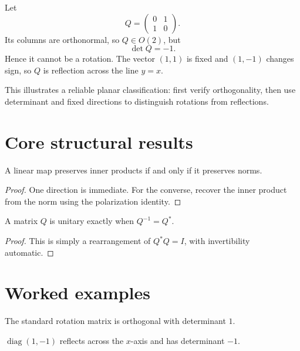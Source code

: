\begin{example}\label{ex:i15-expand-03}
Let
\[
Q=\begin{pmatrix}0&1\\1&0\end{pmatrix}.
\]
Its columns are orthonormal, so \(Q\in O(2)\), but
\[
\det Q=-1.
\]
Hence it cannot be a rotation. The vector \((1,1)\) is fixed and
\((1,-1)\) changes sign, so \(Q\) is reflection across the line \(y=x\).

This illustrates a reliable planar classification: first verify orthogonality,
then use determinant and fixed directions to distinguish rotations from
reflections.
\end{example}
\section{Core structural results}

\begin{theorem}\label{thm:i15-01}
A linear map preserves inner products if and only if it preserves norms.
\begin{proof}
One direction is immediate. For the converse, recover the inner product from the norm using the polarization identity.
\end{proof}
\end{theorem}

\begin{theorem}\label{thm:i15-02}
A matrix $Q$ is unitary exactly when $Q^{-1}=Q^*$.
\begin{proof}
This is simply a rearrangement of $Q^*Q=I$, with invertibility automatic.
\end{proof}
\end{theorem}

\section{Worked examples}

\begin{example}\label{ex:i15-worked-01}
The standard rotation matrix is orthogonal with determinant $1$.
\end{example}

\begin{example}[Reflection]\label{ex:i15-worked-02}
$\operatorname{diag}(1,-1)$ reflects across the $x$-axis and has determinant $-1$.
\end{example}

